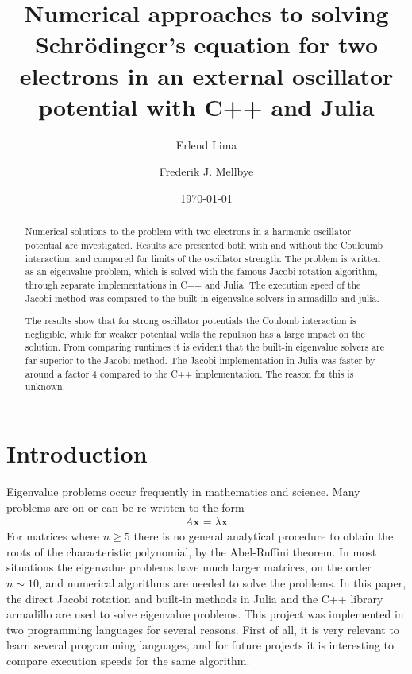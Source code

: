 \documentclass[aps,reprint]{revtex4-1}
\begin{document}
\title{Numerical approaches to solving Schrödinger's equation for
two electrons in an external oscillator potential with C++ and Julia}
\author{Erlend Lima}
\author{Frederik J. Mellbye}
\date{\today}

\begin{abstract}
Numerical solutions to the problem with two electrons in a harmonic oscillator
potential are investigated. Results are presented both with and without
the Couloumb interaction, and compared for limits of the oscillator strength.
The problem is written as an eigenvalue problem, which is solved with the
famous Jacobi rotation algorithm, through separate implementations in C++ and Julia.
The execution speed of the Jacobi method was compared to the built-in eigenvalue solvers
in armadillo and julia.

The results show that for strong oscillator potentials the Coulomb interaction is negligible,
while for weaker potential wells the repulsion has a large impact on the solution. From
comparing runtimes it is evident that the built-in eigenvalue solvers are far superior
to the Jacobi method. The Jacobi implementation in Julia was faster by around a factor
4 compared to the C++ implementation. The reason for this is unknown.
\end{abstract}
\maketitle
\tableofcontents
\makeatletter
\let\toc@pre\relax
\let\toc@post\relax
\makeatother

\newpage

\section{Introduction}
\label{sec:introduction}
Eigenvalue problems occur frequently in mathematics and science. Many problems
are on or can be re-written to the form
\begin{align*}
  A \mathbf{x} = \lambda \mathbf{x}
\end{align*}
For matrices where $n \geq 5$ there is
no general analytical procedure to obtain the roots of the characteristic polynomial, by the
Abel-Ruffini theorem. In most situations the eigenvalue problems have much
larger matrices, on the order \(n\sim 10\), and numerical algorithms are needed to solve the problems. In
this paper, the direct Jacobi rotation and built-in methods in Julia and the C++
library armadillo are used to solve eigenvalue problems. This project was implemented
in two programming languages for several reasons. First of all, it is very relevant to
learn several programming languages, and for future projects it is interesting
to compare execution speeds for the same algorithm.
\end{document}
